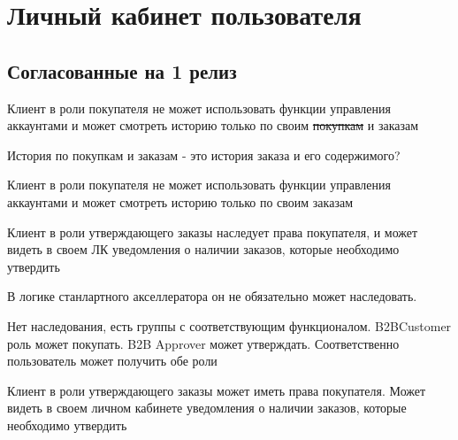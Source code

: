 \section{Личный кабинет пользователя}

\ifcand
\subsection{Согласованные на 1 релиз}
\fi
{}
{

\begin{wiki}
Клиент в роли покупателя не может использовать функции управления аккаунтами и может смотреть историю только по своим \sout{покупкам} и заказам
\end{wiki}

\begin{hybris}
История по покупкам и заказам - это история заказа и его содержимого?
\end{hybris}


\begin{itogo}
Клиент в роли покупателя не может использовать функции управления аккаунтами и может смотреть историю только по своим заказам
\end{itogo}




}
{


\begin{wiki}
Клиент в роли утверждающего заказы наследует права покупателя, и может видеть в своем ЛК уведомления о наличии заказов, которые необходимо утвердить
\end{wiki}

\begin{teamidea}
В логике станлартного акселлератора он не обязательно может наследовать.
\end{teamidea}

\begin{hybris}
Нет наследования, есть группы с соответствующим функционалом. B2BCustomer роль может покупать. B2B Approver может утверждать. Соответственно пользователь может получить обе роли
\end{hybris}


\begin{itogo}
Клиент в роли утверждающего заказы может иметь права покупателя. Может видеть в своем личном кабинете уведомления о наличии заказов, которые необходимо утвердить
\end{itogo}



}
